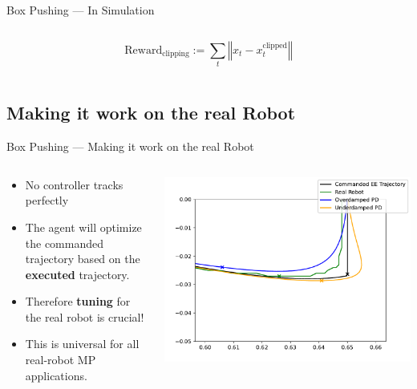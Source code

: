 \documentclass[16:9,en,navbarinfooter]{sdqbeamer}
\begin{document}
\begin{frame}{Box Pushing --- In Simulation}
\begin{columns}[t]
\begin{column}{0.5\textwidth}
        \[ \text{Reward}_{\text{clipping}} := \sum_t \left\Vert x_t - x_t^\text{clipped} \right\Vert \]
    \end{column}
\end{columns}
\end{frame}

\subsection{Making it work on the real Robot}

\begin{frame}{Box Pushing --- Making it work on the real Robot}
\begin{columns}
    \begin{column}{0.5\textwidth}
        \begin{itemize}
                \item No controller tracks perfectly
                \item The agent will optimize the commanded trajectory based on the \textbf{executed} trajectory.
                \item Therefore \textbf{tuning} for the real robot is crucial!
                \item This is universal for all real-robot MP applications.
        \end{itemize}
    \end{column}
    \begin{column}{0.5\textwidth}
\includegraphics[width=\linewidth]{media/traj_error.pdf}
    \end{column}
\end{columns}

\end{frame}
\end{document}
